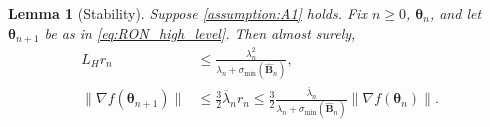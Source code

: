 \documentclass[11pt]{amsart}
\theoremstyle{plain}
\newtheorem{lemma}[theorem]{Lemma}
\theoremstyle{definition}
\theoremstyle{remark}
\def\eps{\varepsilon}
\def\B{\mathbf{B}}
\def\param{\boldsymbol{\theta}}
\newcommand{\commHL}[1]{{\textcolor{blue}{#1}}}
\begin{document}
\begin{lemma}[Stability]\label{lem:stability}
	Suppose \ref{assumption:A1} holds. 
	Fix $n\ge 0$, $\param_{n}$, and let $\param_{n+1}$ be as in \eqref{eq:RON_high_level}. Then almost surely,
    \begin{align}
        L_{H}
        r_{n} &\le \frac{ \lambda_{n}^{2}}{\lambda_{n}+\sigma_{\min}(\hat{\B}_{n}) },  
        \label{eq:stability1} \\
        \|\nabla f(\param_{n+1})\| & \leq \frac{3}{2}\overline{\lambda}_n r_{n}\leq  \frac{3}{2}\frac{\overline{\lambda}_n}{\lambda_n+\sigma_{\min}({\hat{\B}_n})}\|\nabla f(\param_n)\|\label{eq:stability2}.
    \end{align}
\end{lemma}
\end{document}
